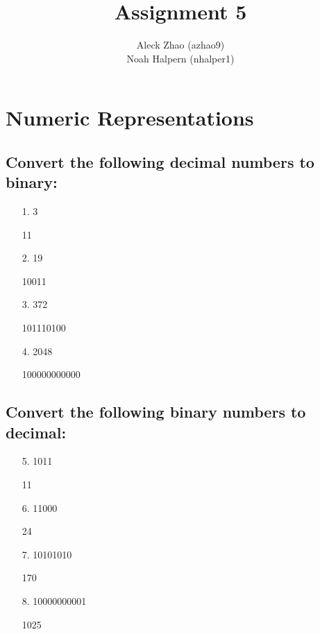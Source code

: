 \documentclass{article}
\begin{document}
\title{Assignment 5}
\author{Aleck Zhao (azhao9) \\ Noah Halpern (nhalper1)}
\maketitle
\thispagestyle{fancy}

\section*{Numeric Representations}
\subsection*{Convert the following decimal numbers to binary:}

\begin{itemize}
	\item[1.] 3
		\begin{answer*}
			11
		\end{answer*}

	\item[2.] 19
		\begin{answer*}
			10011
		\end{answer*}

	\item[3.] 372
		\begin{answer*}
			101110100
		\end{answer*}

	\item[4.] 2048
		\begin{answer*}
			100000000000
		\end{answer*}

\end{itemize}

\subsection*{Convert the following binary numbers to decimal:}

\begin{itemize}
	\item[5.] 1011
		\begin{answer*}
			11
		\end{answer*}

	\item[6.] 11000
		\begin{answer*}
			24
		\end{answer*}

	\item[7.] 10101010
		\begin{answer*}
			170
		\end{answer*}

	\item[8.] 10000000001
		\begin{answer*}
			1025
		\end{answer*}
		
\end{itemize}
\end{document}
